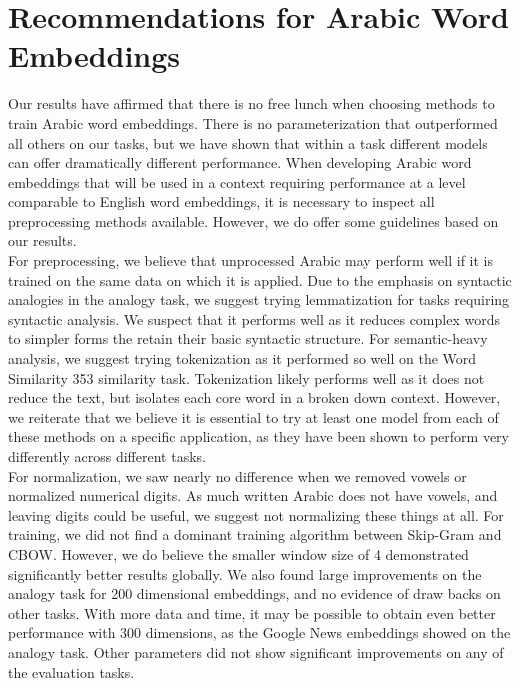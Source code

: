 \section{Recommendations for Arabic Word Embeddings}
\label{sec:recommendations}

Our results have affirmed that there is no free lunch when choosing methods to train Arabic word embeddings. There is no parameterization that outperformed all others on our tasks, but we have shown that within a task different models can offer dramatically different performance. When developing Arabic word embeddings that will be used in a context requiring performance at a level comparable to English word embeddings, it is necessary to inspect all preprocessing methods available. However, we do offer some guidelines based on our results.
\\
For preprocessing, we believe that unprocessed Arabic may perform well if it is trained on the same data on which it is applied. Due to the emphasis on syntactic analogies in the analogy task, we suggest trying lemmatization for tasks requiring syntactic analysis. We suspect that it performs well as it reduces complex words to simpler forms the retain their basic syntactic structure. For semantic-heavy analysis, we suggest trying tokenization as it performed so well on the Word Similarity 353 similarity task. Tokenization likely performs well as it does not reduce the text, but isolates each core word in a broken down context. However, we reiterate that we believe it is essential to try at least one model from each of these methods on a specific application, as they have been shown to perform very differently across different tasks.
\\
For normalization, we saw nearly no difference when we removed vowels or normalized numerical digits. As much written Arabic does not have vowels, and leaving digits could be useful, we suggest not normalizing these things at all. For training, we did not find a dominant training algorithm between Skip-Gram and CBOW. However, we do believe the smaller window size of 4 demonstrated significantly better results globally. We also found large improvements on the analogy task for 200 dimensional embeddings, and no evidence of draw backs on other tasks. With more data and time, it may be possible to obtain even better performance with 300 dimensions, as the Google News embeddings showed on the analogy task. Other parameters did not show significant improvements on any of the evaluation tasks.